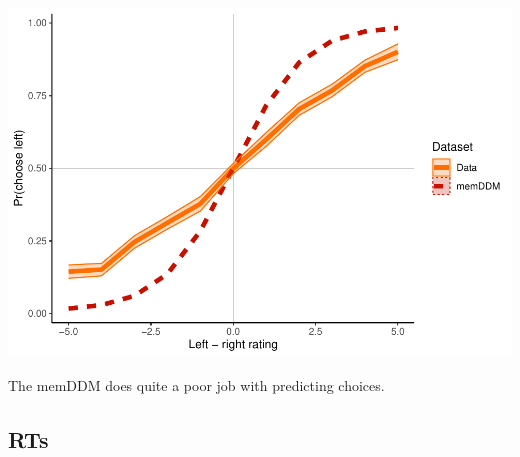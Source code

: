 \documentclass[
]{book}
\begin{document}
\includegraphics{LateNightBayes_files/figure-latex/unnamed-chunk-67-1.pdf}

The memDDM does quite a poor job with predicting choices.

\hypertarget{rts}{%
\subsection{RTs}\label{rts}}
\end{document}
